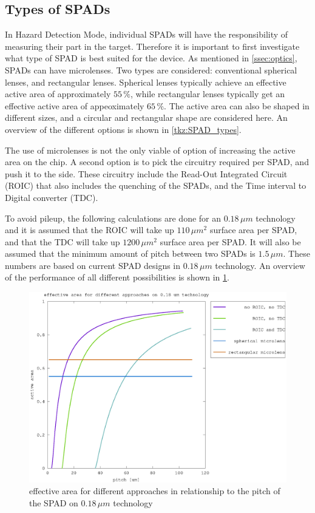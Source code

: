 \subsection{Types of SPADs}\label{ssec:SPADs}
In Hazard Detection Mode, individual SPADs will have the responsibility of measuring their part in the target. Therefore it is important to first investigate what type of SPAD is best suited for the device. As mentioned in \cref{ssec:optics}, SPADs can have microlenses. Two types are considered: conventional spherical lenses, and rectangular lenses. Spherical lenses typically achieve an effective active area of approximately $55\,\%$, while rectangular lenses typically get an effective active area of appeoximately $65\,\%$. The active area can also be shaped in different sizes, and a circular and rectangular shape are considered here. An overview of the different options is shown in \cref{tkz:SPAD_types}.




The use of microlenses is not the only viable of option of increasing the active area on the chip. A second option is to pick the circuitry required per SPAD, and push it to the side. These circuitry include the Read-Out Integrated Circuit (ROIC) that also includes the quenching of the SPADs, and the Time interval to Digital converter (TDC). 

To avoid pileup, the following calculations are done for an $0.18\,\mu m$ technology and it is assumed that the ROIC will take up $110\,\mu m^2$ surface area per SPAD, and that the TDC will take up $1200\,\mu m^2$ surface area per SPAD. It will also be assumed that the minimum amount of pitch between two SPADs is $1.5\,\mu m$. These numbers are based on current SPAD designs in $0.18\,\mu m$ technology. An overview of the performance of all different possibilities is shown in \cref{fig:effective_area}.

\begin{figure}[h]
\centering
	\includegraphics[width=0.8\linewidth]{fig/effective_area.eps}
\caption{effective area for different approaches in relationship to the pitch of the SPAD on $0.18\,\mu m$ technology}
\label{fig:effective_area}
\end{figure} 


